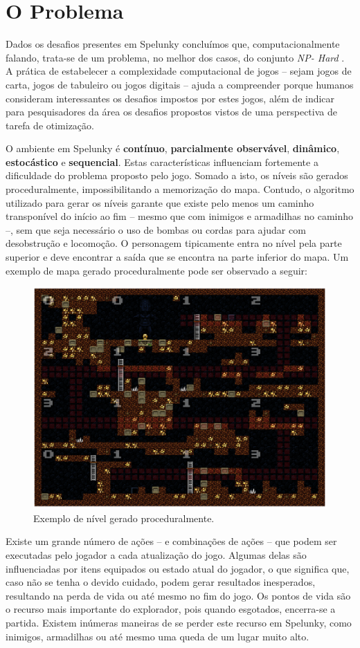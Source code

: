 \chapter{\label{chap:problem}O Problema}
Dados os desafios presentes em Spelunky concluímos que, computacionalmente
falando, trata-se de um problema, no melhor dos casos, do conjunto \textit{NP-
Hard} \cite{SPELUNKYHARD}. A prática de estabelecer a complexidade computacional
de jogos -- sejam jogos de carta, jogos de tabuleiro ou jogos digitais -- ajuda
a compreender  porque humanos consideram interessantes os desafios impostos por
estes jogos, além de indicar para pesquisadores da área os desafios propostos
vistos de uma perspectiva de tarefa de otimização.

O ambiente em Spelunky é \textbf{contínuo}, \textbf{parcialmente observável},
\textbf{dinâmico}, \textbf{estocástico} e \textbf{sequencial}. Estas
características influenciam fortemente a dificuldade do problema proposto pelo
jogo. Somado a isto, os níveis são gerados proceduralmente, impossibilitando a
memorização do mapa. Contudo, o algoritmo utilizado para gerar os níveis garante
que existe pelo menos um caminho transponível do início ao fim -- mesmo que com
inimigos e armadilhas no caminho --, sem que seja necessário o uso de bombas ou
cordas para ajudar com desobstrução e locomoção. O personagem tipicamente entra
no nível pela parte superior e deve encontrar a saída que se encontra na parte
inferior do mapa. Um exemplo de mapa gerado proceduralmente pode ser observado a
seguir:

\begin{figure}[htb!]
\centering\includegraphics[width=.65\textwidth]{fig/spelunky-level-example.png}
\caption {\label{fig:spelunky-level-example}Exemplo de nível gerado
proceduralmente.} \end{figure}

Existe um grande número de ações -- e combinações de ações -- que podem ser
executadas pelo jogador a cada atualização do jogo. Algumas delas são
influenciadas por itens equipados ou estado atual do jogador, o que significa
que, caso não se tenha o devido cuidado, podem gerar resultados inesperados,
resultando na perda de vida ou até mesmo no fim do jogo. Os pontos de vida são o
recurso mais importante do explorador, pois quando esgotados, encerra-se a
partida. Existem inúmeras maneiras de se perder este recurso em Spelunky, como
inimigos, armadilhas ou até mesmo uma queda de um lugar muito alto.

